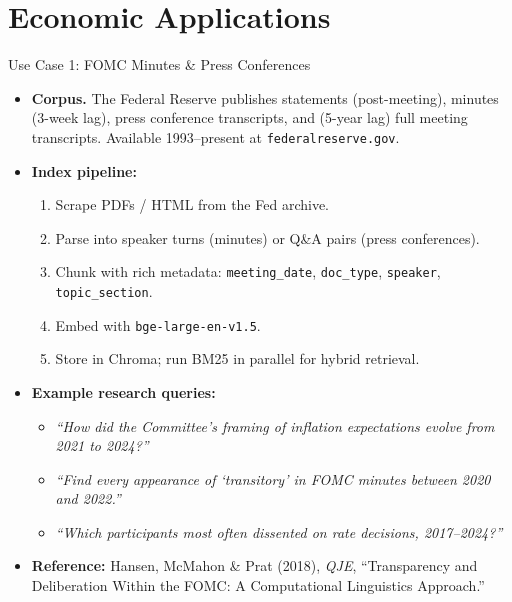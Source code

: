 \section{Economic Applications}

\begin{frame}{Use Case 1: FOMC Minutes \& Press Conferences}
\begin{itemize}
\item \textbf{Corpus.} The Federal Reserve publishes statements (post-meeting), minutes (3-week lag), press conference transcripts, and (5-year lag) full meeting transcripts. Available 1993--present at \texttt{federalreserve.gov}.

\medskip
\item \textbf{Index pipeline:}
\begin{enumerate}
    \item Scrape PDFs / HTML from the Fed archive.
    \item Parse into speaker turns (minutes) or Q\&A pairs (press conferences).
    \item Chunk with rich metadata: \texttt{meeting\_date}, \texttt{doc\_type}, \texttt{speaker}, \texttt{topic\_section}.
    \item Embed with \texttt{bge-large-en-v1.5}.
    \item Store in Chroma; run BM25 in parallel for hybrid retrieval.
\end{enumerate}

\medskip
\item \textbf{Example research queries:}
\begin{itemize}
    \item \emph{``How did the Committee's framing of inflation expectations evolve from 2021 to 2024?''}
    \item \emph{``Find every appearance of `transitory' in FOMC minutes between 2020 and 2022.''}
    \item \emph{``Which participants most often dissented on rate decisions, 2017--2024?''}
\end{itemize}

\medskip
\item \textbf{Reference:} Hansen, McMahon \& Prat (2018), \emph{QJE}, ``Transparency and Deliberation Within the FOMC: A Computational Linguistics Approach.''
\end{itemize}
\end{frame}

